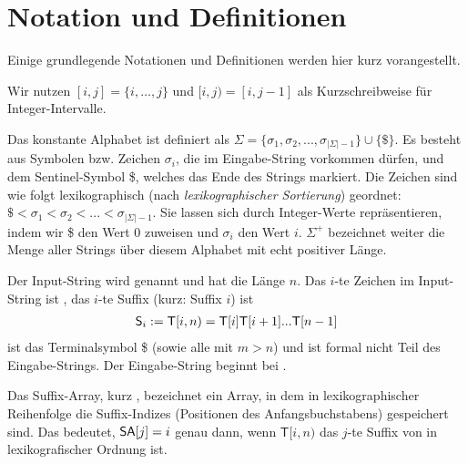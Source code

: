 \section{Notation und Definitionen}
Einige grundlegende Notationen und Definitionen werden hier kurz vorangestellt.

\begin{definition}[Intervall]
Wir nutzen $[i, j] = \{i, \dots, j\}$ und $[i, j) = [i, j - 1]$ als Kurzschreibweise für Integer-Intervalle.
\end{definition}

\begin{definition}
Das konstante Alphabet ist definiert als $\Sigma = \{\sigma_1, \sigma_2, ..., \sigma_{|\Sigma|-1}\} \cup \{\$\}$.
Es besteht aus Symbolen bzw. Zeichen $\sigma_i$, die im Eingabe-String vorkommen dürfen, und dem Sentinel-Symbol \$, welches das Ende des Strings markiert.
Die Zeichen sind wie folgt lexikographisch (nach \textit{lexikographischer Sortierung})
geordnet: $\$ < \sigma_1 < \sigma_2 < ... < \sigma_{|\Sigma|-1}$.
Sie lassen sich durch Integer-Werte repräsentieren, indem wir \$ den Wert 0 zuweisen und $\sigma_i$ den Wert $i$.
$\Sigma^+$ bezeichnet weiter die Menge aller Strings über diesem Alphabet mit echt positiver Länge.
\end{definition}

\begin{definition}
Der Input-String wird  genannt und hat die Länge $n$. Das $i$-te Zeichen im
Input-String ist , das $i$-te Suffix  (kurz: Suffix $i$) ist
\begin{align*}
\suffix{i} := \inputtext[i,n) = \inputtext[i]\inputtext[i+1]...\inputtext[n-1]
\end{align*} 
ist das Terminalsymbol \$ (sowie alle  mit $m>n$) und ist formal nicht Teil des Eingabe-Strings.
Der Eingabe-String beginnt bei .
\end{definition}

\begin{definition}
Das Suffix-Array, kurz \sa, bezeichnet ein Array, in dem in lexikographischer Reihenfolge
die Suffix-Indizes (Positionen des Anfangsbuchstabens) gespeichert sind.
Das bedeutet, $\sa[j] = i$ genau dann, wenn $\mathsf{T}[i,n)$ das $j$-te Suffix von  in lexikografischer Ordnung ist.
\end{definition}

